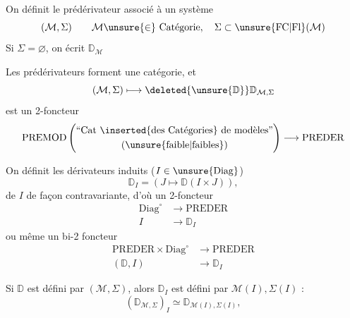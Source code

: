 On définit le prédérivateur  associé à un système
\[
 (\mathcal M,\Sigma)\qquad \mathcal M\unsure{\in}\ \text{Catégorie},\quad\Sigma\subset\unsure{\mathrm{FC}|\mathrm{Fl}}(\mathcal M)
\]
Si $\Sigma=\varnothing$, on  écrit $\mathbb D_{\mathcal M}$

Les prédérivateurs forment une catégorie, et
\[
 (\mathcal M,\Sigma)\longmapsto\deleted{\unsure{\mathbb D}}\mathbb D_{\mathcal M,\Sigma}
\]
est un 2-foncteur
\[
 \mathrm{PREMOD}\left(\begin{gathered}\text{``Cat \inserted{des Catégories} de modèles''}\\ \text{(\unsure{faible|faibles})}\end{gathered}\right)\longrightarrow\mathrm{PREDER}
\]

 On définit les dérivateurs induits ($I\in\unsure{\mathrm{Diag}}$)
\[
 \mathbb D_I=(J\longmapsto\mathbb D(I\times J)),
\]
 de $I$ de façon contravariante, d'où un 2-foncteur
\[
 \begin{aligned}
 \mathrm{Diag}^{\circ}&\longrightarrow\mathrm{PREDER}\\
 I&\to\mathbb D_I
 \end{aligned}
\]
ou même un bi-2 foncteur
\[
 \begin{aligned}
 \mathrm{PREDER}\times\mathrm{Diag}^{\circ}&\longrightarrow\mathrm{PREDER}\\
 (\mathbb D,I)&\to\mathbb D_I
 \end{aligned}
\]

Si $\mathbb D$ est défini par $(\mathcal M,\Sigma)$, alors $\mathbb D_I$ est défini par $\mathcal M(I),\Sigma(I)$ :
\[
 (\mathbb D_{\mathcal M,\Sigma})_I\simeq\mathbb D_{\mathcal M(I),\Sigma(I)},
\]
